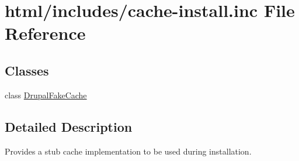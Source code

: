 \hypertarget{cache-install_8inc}{
\section{html/includes/cache-\/install.inc File Reference}
\label{cache-install_8inc}
}
\subsection*{Classes}
\begin{DoxyCompactItemize}
\item 
class \hyperlink{classDrupalFakeCache}{DrupalFakeCache}
\end{DoxyCompactItemize}


\subsection{Detailed Description}
Provides a stub cache implementation to be used during installation. 